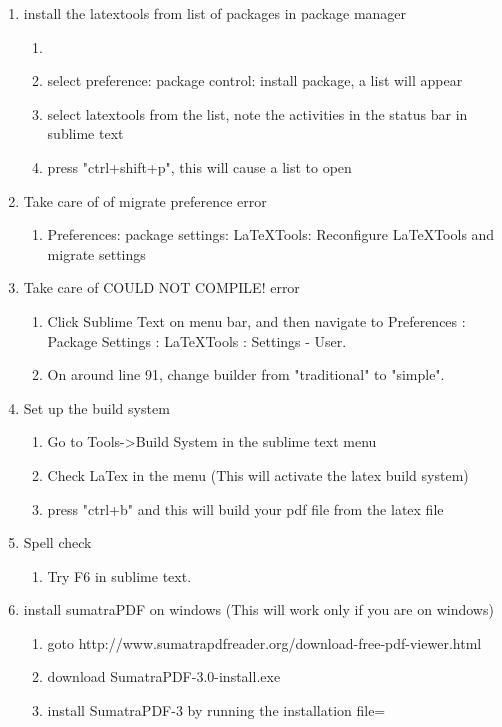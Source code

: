 \documentclass{memoir}
\begin{document}
\begin{enumerate}
  \item install the latextools from list of packages in package manager
  \begin{enumerate}
    \item 
    \item select preference: package control: install package, a list will appear
    \item select latextools from the list, note the activities in the status bar in sublime text
    \item press "ctrl+shift+p", this will cause a list to open
  \end{enumerate}  
 

  \item Take care of of migrate preference error
  \begin{enumerate}
    \item Preferences: package settings: LaTeXTools: Reconfigure LaTeXTools and migrate settings
  \end{enumerate} 

  \item  Take care of COULD NOT COMPILE! error

  \begin{enumerate}
    \item  Click Sublime Text on menu bar, and then navigate to Preferences : Package Settings : LaTeXTools : Settings - User.
    \item  On around line 91, change builder from "traditional" to "simple".
  \end{enumerate} 

  \item  Set up the build system

  \begin{enumerate}
  \item Go to Tools->Build System in the sublime text menu
  \item Check LaTex in the menu (This will activate the latex build system)
  \item press "ctrl+b" and this will build your pdf file from the latex file
  \end{enumerate} 

  \item  Spell check 
  \begin{enumerate}
    \item  Try F6 in sublime text.
  \end{enumerate} 



  \item install sumatraPDF on windows (This will work only if you are on windows)
  \begin{enumerate}
    \item goto http://www.sumatrapdfreader.org/download-free-pdf-viewer.html
    \item download SumatraPDF-3.0-install.exe
    \item install SumatraPDF-3 by running the installation file=
  \end{enumerate}


\end{enumerate}
\end{document}
